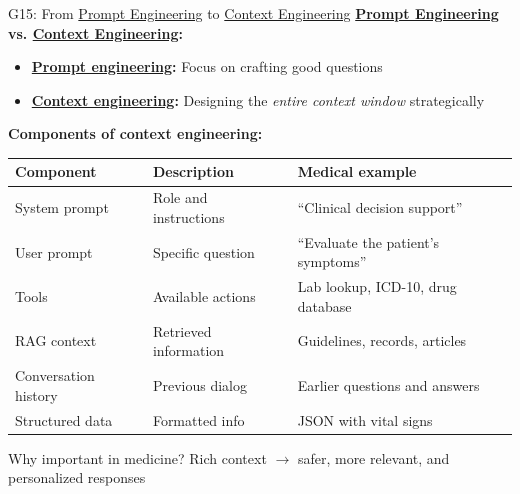 \documentclass[aspectratio=169, 10pt]{beamer}
\begin{document}
\begin{frame}{G15: From \href{https://en.wikipedia.org/wiki/Prompt_engineering}{Prompt Engineering} to \href{https://www.promptingguide.ai/guides/context-engineering-guide}{Context Engineering}}
    \textbf{\href{https://en.wikipedia.org/wiki/Prompt_engineering}{Prompt Engineering} vs. \href{https://www.promptingguide.ai/guides/context-engineering-guide}{Context Engineering}:}
    \begin{itemize}
        \item \textbf{\href{https://en.wikipedia.org/wiki/Prompt_engineering}{Prompt engineering}:} Focus on crafting good questions
        \item \textbf{\href{https://www.promptingguide.ai/guides/context-engineering-guide}{Context engineering}:} Designing the \textit{entire context window} strategically
    \end{itemize}
    
    \vspace{0.2cm}
    \textbf{Components of context engineering:}
    \footnotesize
    \begin{tabular}{lll}
        \toprule
        \textbf{Component} & \textbf{Description} & \textbf{Medical example} \\
        \midrule
        System prompt & Role and instructions & ``Clinical decision support'' \\
        User prompt & Specific question & ``Evaluate the patient's symptoms'' \\
        Tools & Available actions & Lab lookup, ICD-10, drug database \\
        RAG context & Retrieved information & Guidelines, records, articles \\
        Conversation history & Previous dialog & Earlier questions and answers \\
        Structured data & Formatted info & JSON with vital signs \\
        \bottomrule
    \end{tabular}
    
    \normalsize
    \vspace{0.15cm}
    \begin{block}{\footnotesize Why important in medicine?}
        \footnotesize Rich context $\rightarrow$ safer, more relevant, and personalized responses
    \end{block}
\end{frame}
\end{document}
